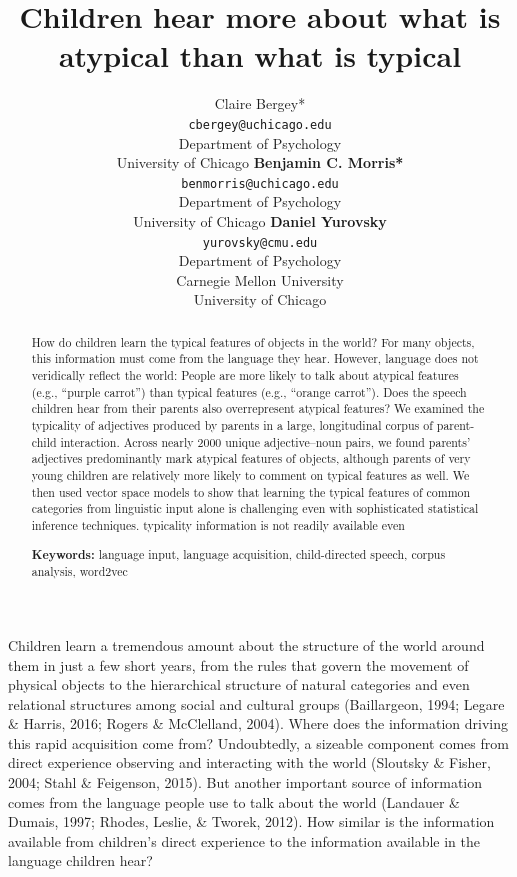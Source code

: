\documentclass[10pt, letterpaper]{article}
\title{Children hear more about what is atypical than what is typical}
\author{Claire Bergey* \\
      \texttt{cbergey@uchicago.edu} \\
     Department of Psychology \\ University of Chicago
\And \textbf{Benjamin C. Morris*} \\
     \texttt{benmorris@uchicago.edu} \\
     Department of Psychology \\ University of Chicago
\And \textbf{Daniel Yurovsky} \\
     \texttt{yurovsky@cmu.edu} \\
     Department of Psychology \\ Carnegie Mellon University \\ University of Chicago}
\begin{document}
\maketitle

\begin{abstract}
How do children learn the typical features of objects in the world? For
many objects, this information must come from the language they hear.
However, language does not veridically reflect the world: People are
more likely to talk about atypical features (e.g., ``purple carrot'')
than typical features (e.g., ``orange carrot''). Does the speech
children hear from their parents also overrepresent atypical features?
We examined the typicality of adjectives produced by parents in a large,
longitudinal corpus of parent-child interaction. Across nearly 2000
unique adjective--noun pairs, we found parents' adjectives predominantly
mark atypical features of objects, although parents of very young
children are relatively more likely to comment on typical features as
well. We then used vector space models to show that learning the typical
features of common categories from linguistic input alone is challenging
even with sophisticated statistical inference techniques. typicality
information is not readily available even

\textbf{Keywords:}
language input, language acquisition, child-directed speech, corpus
analysis, word2vec
\end{abstract}

Children learn a tremendous amount about the structure of the world
around them in just a few short years, from the rules that govern the
movement of physical objects to the hierarchical structure of natural
categories and even relational structures among social and cultural
groups (Baillargeon, 1994; Legare \& Harris, 2016; Rogers \& McClelland,
2004). Where does the information driving this rapid acquisition come
from? Undoubtedly, a sizeable component comes from direct experience
observing and interacting with the world (Sloutsky \& Fisher, 2004;
Stahl \& Feigenson, 2015). But another important source of information
comes from the language people use to talk about the world (Landauer \&
Dumais, 1997; Rhodes, Leslie, \& Tworek, 2012). How similar is the
information available from children's direct experience to the
information available in the language children hear?
\end{document}
